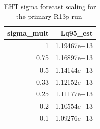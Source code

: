 \begin{table}[t]
\centering
\begin{tabular}{rr}
\toprule
sigma\_mult & Lq95\_est \\
\midrule
1 & 1.19467e+13 \\
0.75 & 1.16897e+13 \\
0.5 & 1.14144e+13 \\
0.33 & 1.12152e+13 \\
0.25 & 1.11177e+13 \\
0.2 & 1.10554e+13 \\
0.1 & 1.09276e+13 \\
\bottomrule
\end{tabular}

\caption{EHT sigma forecast scaling for the primary R13p run.}
\label{tab:r13p_forecast}
\end{table}
